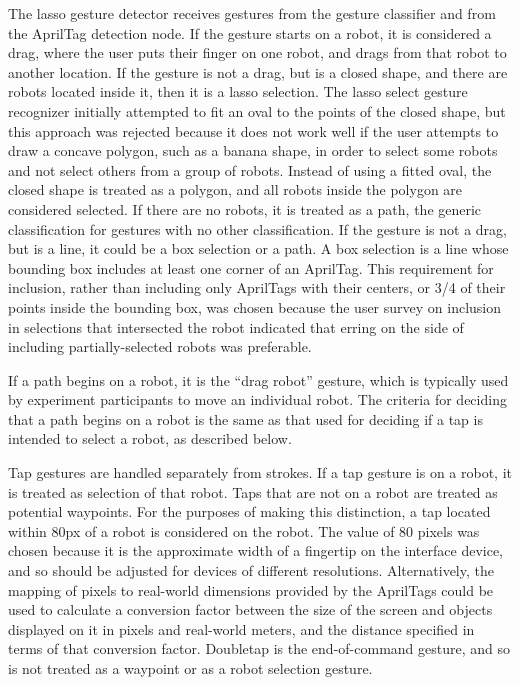 The lasso gesture detector receives gestures from the gesture classifier and from the AprilTag detection node. 
If the gesture starts on a robot, it is considered a drag, where the user puts their finger on one robot, and drags from that robot to another location. 
If the gesture is not a drag, but is a closed shape, and there are robots located inside it, then it is a lasso selection. 
The lasso select gesture recognizer initially attempted to fit an oval to the points of the closed shape, but this approach was rejected because it does not work well if the user attempts to draw a concave polygon, such as a banana shape, in order to select some robots and not select others from a group of robots. 
Instead of using a fitted oval, the closed shape is treated as a polygon, and all robots inside the polygon are considered selected. 
If there are no robots, it is treated as a path, the generic classification for gestures with no other classification. 
If the gesture is not a drag, but is a line, it could be a box selection or a path. 
A box selection is a line whose bounding box includes at least one corner of an AprilTag. 
This requirement for inclusion, rather than including only AprilTags with their centers, or 3/4 of their points inside the bounding box, was chosen because the user survey on inclusion in selections that intersected the robot indicated that erring on the side of including partially-selected robots was preferable. 

If a path begins on a robot, it is the ``drag robot'' gesture, which is typically used by experiment participants to move an individual robot. 
The criteria for deciding that a path begins on a robot is the same as that used for deciding if a tap is intended to select a robot, as described below. 

Tap gestures are handled separately from strokes. 
If a tap gesture is on a robot, it is treated as selection of that robot. 
Taps that are not on a robot are treated as potential waypoints. 
For the purposes of making this distinction, a tap located within 80px of a robot is considered on the robot. 
The value of 80 pixels was chosen because it is the approximate width of a fingertip on the interface device, and so should be adjusted for devices of different resolutions. 
Alternatively, the mapping of pixels to real-world dimensions provided by the AprilTags could be used to calculate a conversion factor between the size of the screen and objects displayed on it in pixels and real-world meters, and the distance specified in terms of that conversion factor. 
Doubletap is the end-of-command gesture, and so is not treated as a waypoint or as a robot selection gesture. 

